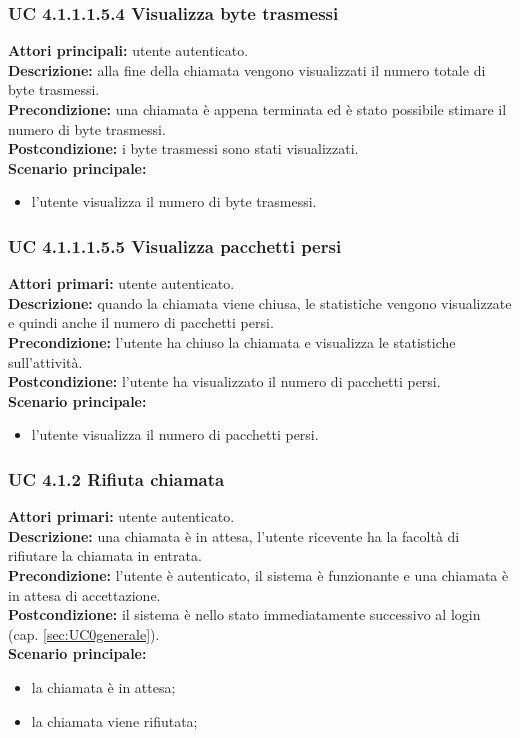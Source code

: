 \subsubsection{UC 4.1.1.1.5.4 Visualizza byte trasmessi}
\noindent 
\textbf{Attori principali:} utente autenticato.\\
\textbf{Descrizione:} alla fine della chiamata vengono visualizzati il numero totale di byte trasmessi.\\
\textbf{Precondizione:} una chiamata è appena terminata ed è stato possibile stimare il numero di byte trasmessi.\\
\textbf{Postcondizione:} i byte trasmessi sono stati visualizzati.\\
\textbf{Scenario principale:}
\begin{itemize}
\item l'utente visualizza il numero di byte trasmessi.
\end{itemize}

\subsubsection{UC 4.1.1.1.5.5 Visualizza pacchetti persi}
\noindent
\textbf{Attori primari:} utente autenticato.\\
\textbf{Descrizione:} quando la chiamata viene chiusa, le statistiche vengono visualizzate e quindi anche il numero di pacchetti persi.\\
\textbf{Precondizione:} l'utente ha chiuso la chiamata e visualizza le statistiche sull'attività.\\
\textbf{Postcondizione:} l'utente ha visualizzato il numero di pacchetti persi.\\
\textbf{Scenario principale:}
\begin{itemize}
\item l'utente visualizza il numero di pacchetti persi.
\end{itemize}

\subsubsection{UC 4.1.2 Rifiuta chiamata}
\noindent
\textbf{Attori primari:} utente autenticato.\\
\textbf{Descrizione:} una chiamata è in attesa, l'utente ricevente ha la facoltà di rifiutare la chiamata in entrata.\\
\textbf{Precondizione:} l'utente è autenticato, il sistema è funzionante e una chiamata è in attesa di accettazione.\\
\textbf{Postcondizione:} il sistema è nello stato immediatamente successivo al login (cap. \ref{sec:UC0generale}).\\
\textbf{Scenario principale:}
\begin{itemize}
\item la chiamata è in attesa;
\item la chiamata viene rifiutata;
\end{itemize}

